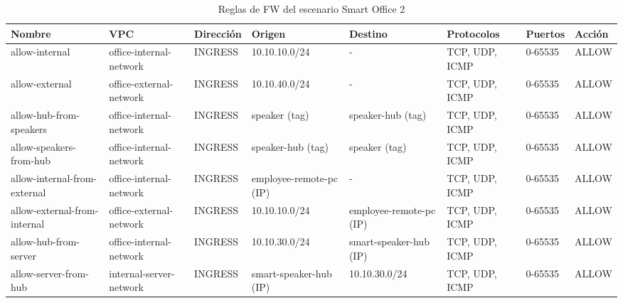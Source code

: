   \begin{table}[h]
    \begin{center}
      \footnotesize\hspace*{-1.75cm}\begin{tabular}{ | m{2cm} | m{2cm} | w{c}{1,5cm} | m{2cm} | m{2cm} | m{2cm} | w{c}{1,25cm} | w{c}{1,25cm} | }
        \hline{} \centering\textbf{Nombre} & \centering\textbf{VPC} & \textbf{Dirección} & \centering\textbf{Origen} & \centering\textbf{Destino} & \centering\textbf{Protocolos} & \textbf{Puertos} & \textbf{Acción} \\ \hline
        allow-internal & office-internal-network & INGRESS & 10.10.10.0/24 & \centering- & TCP, UDP, ICMP & 0-65535 & ALLOW  \\ \hline{}
        allow-external & office-external-network & INGRESS & 10.10.40.0/24 & \centering- & TCP, UDP, ICMP & 0-65535 & ALLOW  \\ \hline
        allow-hub-from-speakers & office-internal-network & INGRESS & speaker (tag) & speaker-hub (tag) & TCP, UDP, ICMP & 0-65535 & ALLOW  \\ \hline{}
        allow-speakers-from-hub & office-internal-network & INGRESS & speaker-hub (tag) & speaker (tag) & TCP, UDP, ICMP & 0-65535 & ALLOW  \\ \hline
        allow-internal-from-external & office-internal-network & INGRESS & employee-remote-pc (IP) & \centering- & TCP, UDP, ICMP & 0-65535 & ALLOW  \\ \hline{}
        allow-external-from-internal & office-external-network & INGRESS & 10.10.10.0/24 & employee-remote-pc (IP) & TCP, UDP, ICMP & 0-65535 & ALLOW  \\ \hline
        allow-hub-from-server & office-internal-network & INGRESS & 10.10.30.0/24 & smart-speaker-hub (IP) & TCP, UDP, ICMP & 0-65535 & ALLOW  \\ \hline{}
        allow-server-from-hub & internal-server-network & INGRESS & smart-speaker-hub (IP) & 10.10.30.0/24 & TCP, UDP, ICMP & 0-65535 & ALLOW  \\ \hline 
      \end{tabular}\hspace*{-1.75cm}
      \caption{Reglas de FW del escenario Smart Office 2}
      \label{tab:fw2}
    \end{center}
  \end{table}

